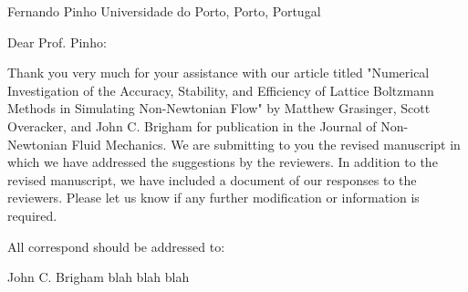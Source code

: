 \documentclass[a4paper,10pt]{article}
\begin{document}
	
Fernando Pinho
Universidade do Porto, Porto, Portugal

Dear Prof. Pinho:

Thank you very much for your assistance with our article titled "Numerical Investigation of the Accuracy, Stability, and Efficiency of Lattice Boltzmann Methods in Simulating Non-Newtonian Flow" by Matthew Grasinger, Scott Overacker, and John C. Brigham for publication in the Journal of Non-Newtonian Fluid Mechanics. We are submitting to you the revised manuscript in which we have addressed the suggestions by the reviewers. In addition to the revised manuscript, we have included a document of our responses to the reviewers. Please let us know if any further modification or information is required.

All correspond should be addressed to:

John C. Brigham
blah blah blah
\end{document}
